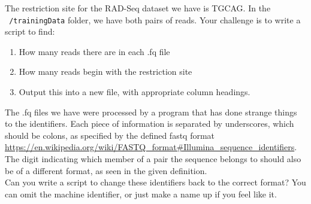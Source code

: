 \documentclass[a4paper,12pt,twoside]{memoir}
\begin{document}
\begin{advanced}
The restriction site for the RAD-Seq dataset we have is TGCAG.
In the \texttt{~/trainingData} folder, we have both pairs of reads.
Your challenge is to write a script to find:
\begin{enumerate}
\item How many reads there are in each .fq file
\item How many reads begin with the restriction site
\item Output this into a new file, with appropriate column headings. \\
\end{enumerate}

The .fq files we have were processed by a program that has done strange things to the identifiers.
Each piece of information is separated by underscores, which should be colons, as specified by the defined fastq format \url{https://en.wikipedia.org/wiki/FASTQ_format#Illumina_sequence_identifiers}.
The digit indicating which member of a pair the sequence belongs to should also be of a different format, as seen in the given definition.\\

Can you write a script to change these identifiers back to the correct format? 
You can omit the machine identifier, or just make a name up if you feel like it.
\end{advanced}
\end{document}
